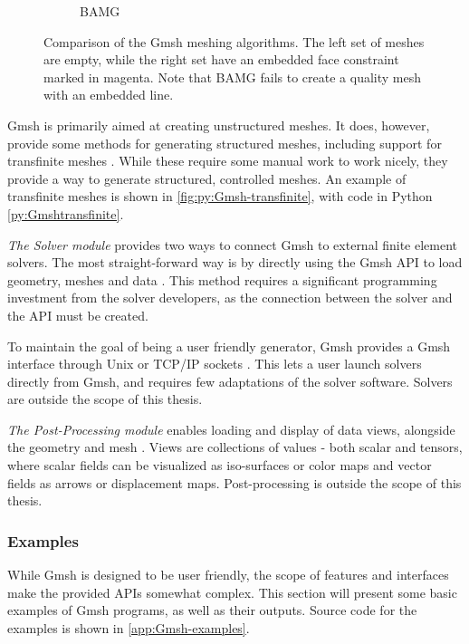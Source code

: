 \begin{figure}[p]
\begin{subfigure}[b]{\textwidth}
\begin{subfigure}[b]{0.33\textwidth}
        \end{subfigure}
        \caption{BAMG}
        \label{fig:Gmsh-BAMG}
    \end{subfigure}
    \caption[Comparison of the Gmsh meshing algorithms]{Comparison of the Gmsh meshing algorithms. The left set of meshes are empty, while the right set have an embedded face constraint marked in magenta. Note that BAMG fails to create a quality mesh with an embedded line.}
    \label{fig:Gmsh-meshing-algorithms}
\end{figure}

Gmsh is primarily aimed at creating unstructured meshes. It does, however, provide some methods for generating structured meshes, including support for transfinite meshes \cite{Gmsh_article}. While these require some manual work to work nicely, they provide a way to generate structured, controlled meshes. An example of transfinite meshes is shown in \autoref{fig:py:Gmsh-transfinite}, with code in Python \ref{py:Gmshtransfinite}.

\emph{The Solver module} provides two ways to connect Gmsh to external finite element solvers. The most straight-forward way is by directly using the Gmsh API to load geometry, meshes and data \cite{Gmsh_article}. This method requires a significant programming investment from the solver developers, as the connection between the solver and the API must be created.

To maintain the goal of being a user friendly generator, Gmsh provides a Gmsh interface through Unix or TCP/IP sockets \cite{Gmsh_article}. This lets a user launch solvers directly from Gmsh, and requires few adaptations of the solver software. Solvers are outside the scope of this thesis.

\emph{The Post-Processing module} enables loading and display of data views, alongside the geometry and mesh \cite{Gmsh_article}. Views are collections of values - both scalar and tensors, where scalar fields can be visualized as iso-surfaces or color maps and vector fields as arrows or displacement maps. Post-processing is outside the scope of this thesis. 


\subsubsection{Examples}
\label{sec:Gmsh-examples}
While Gmsh is designed to be user friendly, the scope of features and interfaces make the provided APIs somewhat complex. This section will present some basic examples of Gmsh programs, as well as their outputs. Source code for the examples is shown in \autoref{app:Gmsh-examples}.

